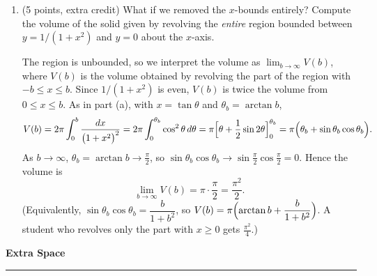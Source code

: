 \documentclass[12pt,letterpaper]{article}
\begin{document}
\begin{enumerate}[label=\textbf{\arabic*.},leftmargin=2em]
\begin{enumerate}[label=(\alph*)]
      \item (5 points, extra credit) What if we removed the $x$-bounds entirely?
      Compute the volume of the solid given by revolving the {\it entire} 
      region bounded between $y = 1/(1 + x^2)$ and $y=0$ about the $x$-axis.

        \begin{solution}
          The region is unbounded, so we interpret the volume as
          $\lim_{b\to\infty}V(b)$, where $V(b)$ is the volume obtained by
          revolving the part of the region with $-b\le x\le b$. Since
          $1/(1+x^2)$ is even, $V(b)$ is twice the volume from
          $0\le x\le b$. As in part (a), with $x=\tan\theta$ and
          $\theta_b=\arctan b$,
          \[
            V(b)=2\pi\int_0^b\frac{dx}{\bigl(1+x^2\bigr)^2}
             =2\pi\int_0^{\theta_b}\cos^2\theta\,d\theta
             =\pi\Bigl[\theta+\frac12\sin2\theta\Bigr]_0^{\theta_b}
             =\pi\Bigl(\theta_b+\sin\theta_b\cos\theta_b\Bigr).
          \]
          As $b\to\infty$, $\theta_b=\arctan b\to\frac\pi2$, so
          $\sin\theta_b\cos\theta_b\to\sin\frac\pi2\cos\frac\pi2=0$. Hence
          the volume is
          \[
            \lim_{b\to\infty}V(b)=\pi\cdot\frac\pi2=\frac{\pi^2}{2}.
          \]
          (Equivalently, $\sin\theta_b\cos\theta_b=\dfrac{b}{1+b^2}$, so
          $V(b)=\pi\Bigl(\arctan b+\dfrac{b}{1+b^2}\Bigr)$. A student who
          revolves only the part with $x\ge0$ gets $\frac{\pi^2}{4}$.)
        \end{solution}
        \vfill
    \end{enumerate}
    \newpage
\end{enumerate}

\begin{center}
  {\Large\bfseries Extra Space}\\[0.3em]
  \noindent\rule{\linewidth}{0.4pt}
\end{center}
\end{document}
